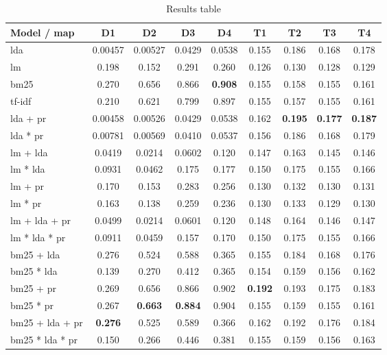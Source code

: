 \begin{table*}[h]
	\centering
	\caption{Results table}
	\begin{tabular}{l|c|c|c|c|c|c|c|c}
		Model / \gls{map} & D1 & D2 & D3 & D4 & T1 & T2 & T3 & T4 \\
		\midrule
		\gls{lda} & 0.00457 & 0.00527 & 0.0429 & 0.0538 & 0.155 & 0.186 & 0.168 & 0.178 \\
		\gls{lm} & 0.198 & 0.152 & 0.291 & 0.260 & 0.126 & 0.130 & 0.128 & 0.129 \\
		\gls{bm25} & 0.270 & 0.656 & 0.866 & \textbf{0.908} & 0.155 & 0.158 & 0.155 & 0.161 \\
		\gls{tf-idf} & 0.210 & 0.621 & 0.799 & 0.897 & 0.155 & 0.157 & 0.155 & 0.161 \\
		\gls{lda} + \gls{pr} & 0.00458 & 0.00526 & 0.0429 & 0.0538 & 0.162 & \textbf{0.195} & \textbf{0.177} & \textbf{0.187} \\
		\gls{lda} * \gls{pr} & 0.00781 & 0.00569 & 0.0410 & 0.0537 & 0.156 & 0.186 & 0.168 & 0.179 \\
		\gls{lm} + \gls{lda} & 0.0419 & 0.0214 & 0.0602 & 0.120 & 0.147 & 0.163 & 0.145 & 0.146 \\
		\gls{lm} * \gls{lda} & 0.0931 & 0.0462 & 0.175 & 0.177 & 0.150 & 0.175 & 0.155 & 0.166 \\
		\gls{lm} + \gls{pr} & 0.170 & 0.153 & 0.283 & 0.256 & 0.130 & 0.132 & 0.130 & 0.131 \\
		\gls{lm} * \gls{pr} & 0.163 & 0.138 & 0.259 & 0.236 & 0.130 & 0.133 & 0.129 & 0.130 \\
		\gls{lm} + \gls{lda} + \gls{pr} & 0.0499 & 0.0214 & 0.0601 & 0.120 & 0.148 & 0.164 & 0.146 & 0.147 \\
		\gls{lm} * \gls{lda} * \gls{pr} & 0.0911 & 0.0459  & 0.157 & 0.170 & 0.150 & 0.175 & 0.155 & 0.166 \\
		\gls{bm25} + \gls{lda} & 0.276 & 0.524 & 0.588 & 0.365 & 0.155 & 0.184 & 0.168 & 0.176 \\
		\gls{bm25} * \gls{lda} & 0.139 & 0.270 & 0.412 & 0.365 & 0.154 & 0.159 & 0.156 & 0.162 \\
		\gls{bm25} + \gls{pr} & 0.269 & 0.656 & 0.866 & 0.902 & \textbf{0.192} & 0.193 & 0.175 & 0.183 \\
		\gls{bm25} * \gls{pr} & 0.267 & \textbf{0.663} & \textbf{0.884} & 0.904 & 0.155 & 0.159 & 0.155 & 0.161 \\
		\gls{bm25} + \gls{lda} + \gls{pr} & \textbf{0.276} & 0.525 & 0.589 & 0.366 & 0.162 & 0.192 & 0.176 & 0.184 \\
		\gls{bm25} * \gls{lda} * \gls{pr} & 0.150 & 0.266 & 0.446 & 0.381 & 0.155 & 0.159 & 0.156 & 0.163 \\
	\end{tabular}
	
	\label{tab:results}
\end{table*}



